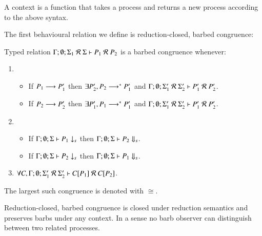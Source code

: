 A context is a function that takes a process and returns a new process
according to the above syntax.


The first behavioural relation we define is reduction-closed, barbed congruence:
%
\begin{definition}\rm
	Typed relation $\Gamma; \emptyset; \Sigma_1\ \mathcal{R}\ \Sigma \vdash P_1 \ \mathcal{R}\ P_2$ is a barbed congruence
	whenever:
	\begin{enumerate}
		\item
		\begin{itemize}
			\item	If $P_1 \longrightarrow P_1'$ then $\exists P_2', P_2 \longrightarrow^* P_1'$ and $\Gamma; \emptyset; \Sigma_1'\ \mathcal{R}\ \Sigma_2' \proves P_1'\ \mathcal{R}\ P_2'$.
			\item	If $P_2 \longrightarrow P_2'$ then $\exists P_1', P_1 \longrightarrow^* P_1'$ and $\Gamma; \emptyset; \Sigma_1'\ \mathcal{R}\ \Sigma_2' \proves P_1'\ \mathcal{R}\ P_2'$.
		\end{itemize}
		\item
		\begin{itemize}
			\item	If $\Gamma;\emptyset;\Sigma \vdash P_1 \downarrow_{s}$ then $\Gamma;\emptyset;\Sigma \vdash P_2 \Downarrow_{s}$.
			\item	If $\Gamma;\emptyset;\Sigma \vdash P_2 \downarrow_{s}$ then $\Gamma;\emptyset;\Sigma \vdash P_1 \Downarrow_{s}$.
		\end{itemize}
		\item	$\forall C, \Gamma; \emptyset; \Sigma_1'\ \mathcal{R}\ \Sigma_2' \proves \context{C}{P_1}\ \mathcal{R}\ \context{C}{P_2}$.
	\end{enumerate}
	The largest such congruence is denoted with $\cong$.
\end{definition}
%
Reduction-closed, barbed congruence is closed under reduction semantics and 
preserves barbs under any context. In a sense no barb observer can distinguish
between two related processes.

